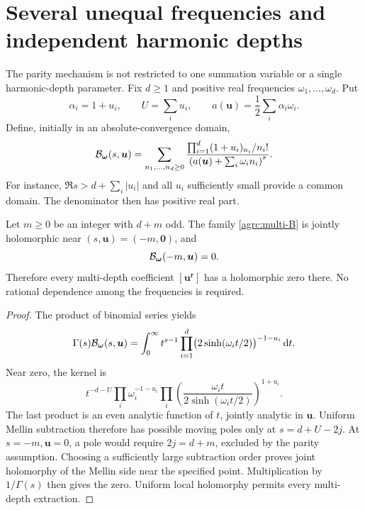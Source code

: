 \section{Several unequal frequencies and independent harmonic depths}
\label{agrc:multifrequency}

The parity mechanism is not restricted to one summation variable or a
single harmonic-depth parameter. Fix $d\geq1$ and positive real
frequencies $\omega_1,\ldots,\omega_d$. Put
\[
 \alpha_i=1+u_i,\qquad U=\sum_i u_i,
 \qquad a(\bm u)=\frac12\sum_i\alpha_i\omega_i.
\]
Define, initially in an absolute-convergence domain,
\begin{equation}\label{agrc:multi-B}
 \mathcal B_{\bm\omega}(s,\bm u)=
 \sum_{n_1,\ldots,n_d\geq0}
 \frac{\prod_{i=1}^d(1+u_i)_{n_i}/n_i!}
      {\left(a(\bm u)+\sum_i\omega_i n_i\right)^s}.
\end{equation}
For instance, $\Re s>d+\sum_i|u_i|$ and all $u_i$ sufficiently small
provide a common domain. The denominator then has positive real part.

\begin{theorem}
\label{agrc:multi-zero}
Let $m\geq0$ be an integer with $d+m$ odd. The family
\eqref{agrc:multi-B} is jointly holomorphic near $(s,\bm u)=(-m,\bm0)$,
and
\begin{equation}\label{agrc:multi-zero-eq}
 \mathcal B_{\bm\omega}(-m,\bm u)=0.
\end{equation}
Therefore every multi-depth coefficient $[\bm u^{\bm r}]$ has a
holomorphic zero there. No rational dependence among the frequencies
is required.
\end{theorem}
\begin{proof}
The product of binomial series yields
\begin{equation}\label{agrc:multi-Mellin}
 \Gamma(s)\mathcal B_{\bm\omega}(s,\bm u)
 =\int_0^\infty t^{s-1}
             \prod_{i=1}^d\bigl(2\sinh(\omega_i t/2)\bigr)^{-1-u_i}
                                                      \,\mathrm d t.
\end{equation}
Near zero, the kernel is
\[
 t^{-d-U}\prod_i\omega_i^{-1-u_i}
  \prod_i\left(\frac{\omega_i t}{2\sinh(\omega_i t/2)}\right)^{1+u_i}.
\]
The last product is an even analytic function of $t$, jointly analytic
in $\bm u$. Uniform Mellin subtraction therefore has possible moving
poles only at $s=d+U-2j$. At $s=-m,\bm u=0$, a pole would require
$2j=d+m$, excluded by the parity assumption. Choosing a sufficiently
large subtraction order proves joint holomorphy of the Mellin side
near the specified point. Multiplication by $1/\Gamma(s)$ then gives
the zero. Uniform local holomorphy permits every multi-depth extraction.
\end{proof}


